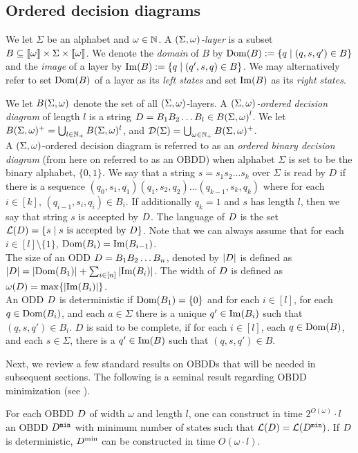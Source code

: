 \subsection{Ordered decision diagrams} 
We let $\Sigma$ be an alphabet and $\omega \in \mathbb{N}$. A  $(\Sigma, \omega)$\emph{-layer} is a subset $B \subseteq \llbracket \omega \rrbracket \times \Sigma \times \llbracket \omega \rrbracket$. We denote the \emph{domain} of $B$ by $\mathrm{Dom}(B):= \{q \;|\; (q,s,q') \in B\}$ and the \emph{image} of a layer by $\mathrm{Im}(B):= \{q \;|\; (q',s,q) \in B\}$. We may alternatively refer to set $\mathrm{Dom}(B)$ of a layer as its \textit{left states} and set \textit{$\mathrm{Im}(B)$} as its \textit{right states}.

We let  $B(\Sigma, \omega)$ denote the set of all $(\Sigma,\omega)$-layers. A $(\Sigma,\omega)$\emph{-ordered decision diagram} of length $l$ is a string $D = B_1B_2\ldots B_l \in {B(\Sigma, \omega)}^l$. We let $B(\Sigma,\omega)^{+} = \bigcup_{l\in \mathbb{N}_+}B(\Sigma,\omega)^{l}$, and $\mathcal{D}(\Sigma) = \bigcup_{\omega\in \mathbb{N}_+} B(\Sigma,\omega)^+$. 
\\ 
A $(\Sigma,\omega)$-ordered decision diagram is referred to as an \emph{ordered binary decision diagram} (from here on referred to as an OBDD) when alphabet $\Sigma$ is set to be the binary alphabet, $\{0,1\}$. We say that a string $s=s_1 s_2 \ldots s_k$ over $\Sigma$ is read by $D$ if there is a sequence $(q_0, s_1,q_1)(q_1,s_2,q_2)\ldots(q_{k-1},s_k,q_k)$ where for each $i \in [k]$, $(q_{i-1},s_i,q_i) \in B_i$. If additionally $q_k = 1$ and $s$ has length $l$, then we say that string $s$ is accepted by $D$. The language of $D$ is the set $\mathcal{L}(D)= \{s\; | \; s \text{ is accepted by } D\}$. Note that we can always assume that for each $i \in [l] \setminus \{1\}$, $\mathrm{Dom}(B_i) = \mathrm{Im}(B_{i-1})$. \
\\
The size of an ODD $D = B_1B_2\dots B_n$, denoted by $|D|$ 
is defined as $|D| = |\mathrm{Dom}(B_1)|+\sum_{i\in [n]} |\mathrm{Im}(B_i)|$. The width 
of $D$ is defined as $\omega(D) = \max\{|\mathrm{Im}(B_i)|\}$. 
\\ 
An ODD $D$ is deterministic if $\mathrm{Dom}(B_1) = \{0\}$ and for each $i \in [l]$, for each $q \in \mathrm{Dom}(B_i)$, and each $a \in \Sigma$ there is a unique $q'\in \mathrm{Im}(B_i)$ such that $(q,s,q') \in B_i$. $D$ is said to be complete, if for each 
$i\in [l]$, each $q\in \mathrm{Dom}(B)$, and each $s\in \Sigma$, 
there is a $q'\in \mathrm{Im}(B)$ such that $(q,s,q')\in B$.

Next, we review a few standard results on OBDDs that will be needed in subsequent sections. The following is a seminal result regarding OBDD minimization (see \cite{bryant1986graph, bryant1992symbolic}).
\begin{theorem}\label{theorem:Minimize}
For each OBDD $D$ of width $\omega$ and length $l$, one can construct in time $2^{O(\omega)}\cdot l$ an OBDD $D^{\texttt{min}}$ with minimum number of states such that $\mathcal{L}(D) = \mathcal{L}(D^{\texttt{min}})$. If $D$ is deterministic, $D^{\min}$ can be constructed in time $O(\omega\cdot l)$. 
\label{theorem:}
\end{theorem}

